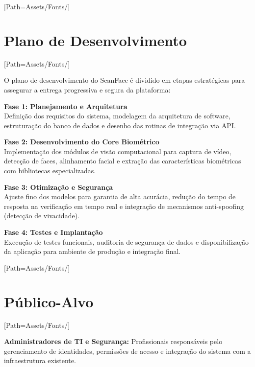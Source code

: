 \documentclass{article}
\begin{document}
\setmainfont{LEMONMILK-Bold.otf}[Path=Assets/Fonts/]
\section{Plano de Desenvolvimento}
\setmainfont{LEMONMILK-Regular.otf}[Path=Assets/Fonts/]

O plano de desenvolvimento do ScanFace é dividido em etapas estratégicas para assegurar a entrega progressiva e segura da plataforma:

\vspace{0.4cm}

\textbf{Fase 1: Planejamento e Arquitetura} \\
Definição dos requisitos do sistema, modelagem da arquitetura de software, estruturação do banco de dados e desenho das rotinas de integração via API.

\vspace{0.3cm}

\textbf{Fase 2: Desenvolvimento do Core Biométrico} \\
Implementação dos módulos de visão computacional para captura de vídeo, detecção de faces, alinhamento facial e extração das características biométricas com bibliotecas especializadas.

\vspace{0.3cm}

\textbf{Fase 3: Otimização e Segurança} \\
Ajuste fino dos modelos para garantia de alta acurácia, redução do tempo de resposta na verificação em tempo real e integração de mecanismos anti-spoofing (detecção de vivacidade).

\vspace{0.3cm}

\textbf{Fase 4: Testes e Implantação} \\
Execução de testes funcionais, auditoria de segurança de dados e disponibilização da aplicação para ambiente de produção e integração final.
\newpage

\setmainfont{LEMONMILK-Bold.otf}[Path=Assets/Fonts/]
\section{Público-Alvo}
\setmainfont{LEMONMILK-Regular.otf}[Path=Assets/Fonts/]

\textbf{Administradores de TI e Segurança:} Profissionais responsáveis pelo gerenciamento de identidades, permissões de acesso e integração do sistema com a infraestrutura existente.
\end{document}
